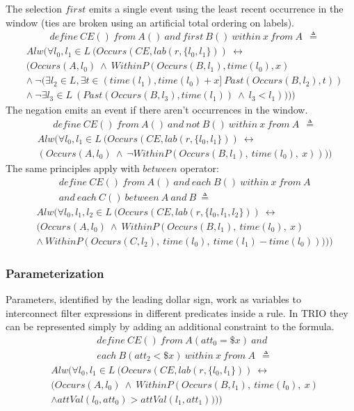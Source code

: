 The selection $first$ emits a single event using the least recent occurrence in the window (ties are broken using an artificial total ordering on labels).
\begin{align*}
&define\ CE()\ from\ A()\ and\ first\ B()\ within\ x\ from\ A\ \ \triangleq
\end{align*}
\begin{align*}
&Alw(\forall l_0, l_1 \in L\ (Occurs(CE, lab(r, \{l_0, l_1\}))\ \leftrightarrow\\
&(Occurs(A, l_0)\ \wedge\ WithinP(Occurs(B, l_1),time(l_0),x)\\
&\wedge\ \neg (\exists l_2 \in L, \exists t\in (time(l_1), time(l_0) + x]\ Past(Occurs(B, l_2),t))\\
&\wedge\ \neg \exists l_3 \in L\ (Past(Occurs(B, l_3), time(l_1))\ \wedge\ l_3 < l_1))))
\end{align*}
The negation emits an event if there aren't occurrences in the window.
\begin{align*}
&define\ CE()\ from\ A()\ and\ not\ B()\ within\ x\ from\ A\ \ \triangleq
\end{align*}
\begin{align*}
&Alw(\forall l_0, l_1 \in L\ (Occurs(CE, lab(r, \{l_0, l_1\}))\ \leftrightarrow\\
&(Occurs(A, l_0)\ \wedge\ \neg WithinP(Occurs(B, l_1),\ time(l_0),\ x))))
\end{align*}
The same principles apply with $between$ operator:
\begin{align*}
&define\ CE()\ from\ A()\ and\ each\ B()\ within\ x\ from\ A\\
&and\ each\ C()\ between\ A\ and\ B\ \triangleq
\end{align*}
\begin{align*}
&Alw(\forall l_0, l_1, l_2 \in L\ (Occurs(CE, lab(r, \{l_0, l_1, l_2\}))\ \leftrightarrow\\
&(Occurs(A, l_0)\ \wedge\ WithinP(Occurs(B, l_1),\ time(l_0),\ x)\\
&\wedge\ WithinP(Occurs(C, l_2),\ time(l_0),\ time(l_1) - time(l_0)))))
\end{align*}

\subsubsection{Parameterization}
Parameters, identified by the leading dollar sign, work as variables to interconnect filter expressions in different predicates inside a rule. In TRIO they can be represented simply by adding an additional constraint to the formula.
\begin{align*}
&define\ CE()\ from\ A(att_0 = \$x)\ and\\
&each\ B(att_2 < \$x)\ within\ x\ from\ A\ \ \triangleq
\end{align*}
\begin{align*}
&Alw(\forall l_0, l_1 \in L\ (Occurs(CE, lab(r, \{l_0, l_1\}))\ \leftrightarrow\\
&(Occurs(A, l_0)\ \wedge\ WithinP(Occurs(B, l_1),\ time(l_0),\ x)\\
&\wedge attVal(l_0, att_0) > attVal(l_1, att_1))))
\end{align*}

